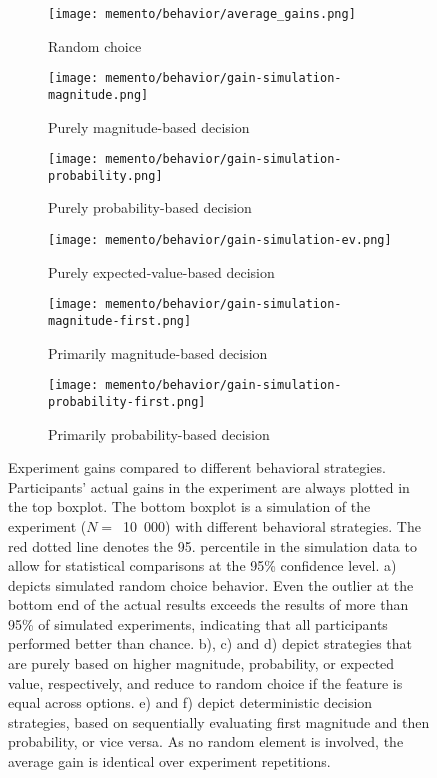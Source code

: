 \begin{figure}[H]
	\centering
	\begin{subfigure}{0.45\textwidth}
		\texttt{[image: memento/behavior/average\_gains.png]}
		\caption{Random choice}
		\label{fig:gains}
	\end{subfigure}
	\begin{subfigure}{0.45\textwidth}
		\texttt{[image: memento/behavior/gain-simulation-magnitude.png]}
		\caption{Purely magnitude-based decision}
		\label{fig:strategy-prob}
	\end{subfigure}
	\begin{subfigure}{0.45\textwidth}
		\texttt{[image: memento/behavior/gain-simulation-probability.png]}
		\caption{Purely probability-based decision}
		\label{fig:strategy-mag}
	\end{subfigure}
	\begin{subfigure}{0.45\textwidth}
		\texttt{[image: memento/behavior/gain-simulation-ev.png]}
		\caption{Purely expected-value-based decision}
		\label{fig:strategy-ev}
	\end{subfigure}
	\begin{subfigure}{0.45\textwidth}
		\texttt{[image: memento/behavior/gain-simulation-magnitude-first.png]}
		\caption{Primarily magnitude-based decision}
		\label{fig:strategy-mag-first}
	\end{subfigure}
	\begin{subfigure}{0.45\textwidth}
		\texttt{[image: memento/behavior/gain-simulation-probability-first.png]}
		\caption{Primarily probability-based decision}
		\label{fig:strategy-prob-first}
	\end{subfigure}
	\caption[Experiment gains compared to different behavioral strategies]{Experiment gains compared to different behavioral strategies. Participants' actual gains in the experiment are always plotted in the top boxplot. The bottom boxplot is a simulation of the experiment ($N=$~10~000) with different behavioral strategies. The red dotted line denotes the 95. percentile in the simulation data to allow for statistical comparisons at the 95\% confidence level. a) depicts simulated random choice behavior. Even the outlier at the bottom end of the actual results exceeds the results of more than 95\% of simulated experiments, indicating that all participants performed better than chance. b), c) and d) depict strategies that are purely based on higher magnitude, probability, or expected value, respectively, and reduce to random choice if the feature is equal across options. e) and f) depict deterministic decision strategies, based on sequentially evaluating first magnitude and then probability, or vice versa. As no random element is involved, the average gain is identical over experiment repetitions.}
\end{figure}


